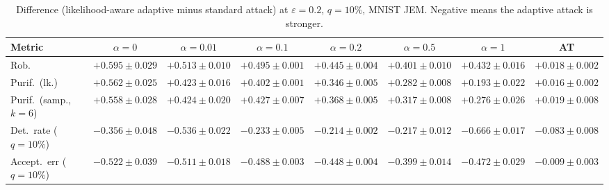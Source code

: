 \begin{table}[htbp]
  \centering
  \begin{tabular}{lccccccc}
    \toprule
    Metric & $\alpha{=}0$ & $\alpha{=}0.01$ & $\alpha{=}0.1$ & $\alpha{=}0.2$ & $\alpha{=}0.5$ & $\alpha{=}1$ & AT \\
    \midrule
    Rob. & $+0.595 \pm 0.029$ & $+0.513 \pm 0.010$ & $+0.495 \pm 0.001$ & $+0.445 \pm 0.004$ & $+0.401 \pm 0.010$ & $+0.432 \pm 0.016$ & $+0.018 \pm 0.002$ \\
    Purif.\ (lk.) & $+0.562 \pm 0.025$ & $+0.423 \pm 0.016$ & $+0.402 \pm 0.001$ & $+0.346 \pm 0.005$ & $+0.282 \pm 0.008$ & $+0.193 \pm 0.022$ & $+0.016 \pm 0.002$ \\
    Purif.\ (samp., $k{=}6$) & $+0.558 \pm 0.028$ & $+0.424 \pm 0.020$ & $+0.427 \pm 0.007$ & $+0.368 \pm 0.005$ & $+0.317 \pm 0.008$ & $+0.276 \pm 0.026$ & $+0.019 \pm 0.008$ \\
    Det.\ rate ($q{=}10\%$) & $-0.356 \pm 0.048$ & $-0.536 \pm 0.022$ & $-0.233 \pm 0.005$ & $-0.214 \pm 0.002$ & $-0.217 \pm 0.012$ & $-0.666 \pm 0.017$ & $-0.083 \pm 0.008$ \\
    Accept.\ err ($q{=}10\%$) & $-0.522 \pm 0.039$ & $-0.511 \pm 0.018$ & $-0.488 \pm 0.003$ & $-0.448 \pm 0.004$ & $-0.399 \pm 0.014$ & $-0.472 \pm 0.029$ & $-0.009 \pm 0.003$ \\
    \bottomrule
  \end{tabular}
  \caption{Difference (likelihood-aware adaptive minus standard attack) at $\varepsilon=0.2$, $q=10\%$, MNIST JEM. Negative means the adaptive attack is stronger.}
  \label{tab:joint_vs_normal_jem_eps0.2}
\end{table}
